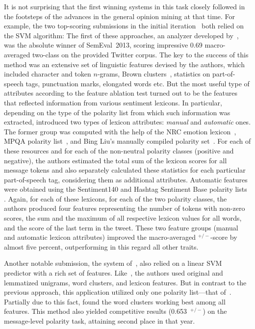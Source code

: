 It is not surprising that the first winning systems in this task
closely followed in the footsteps of the advances in the general
opinion mining at that time.  For example, the two top-scoring
submissions in the initial iteration~\cite{Mohammad:13,Guenther:13}
both relied on the SVM algorithm: The first of these approaches, an
analyzer developed by~\citet{Mohammad:13}, was the absolute winner of
SemEval~2013, scoring impressive 0.69 macro-averaged two-class \F{} on
the provided Twitter corpus.  The key to the success of this method
was an extensive set of linguistic features devised by the authors,
which included character and token $n$-grams, Brown
clusters~\cite{Brown:92}, statistics on part-of-speech tags,
punctuation marks, elongated words etc.  But the most useful type of
attributes according to the feature ablation test turned out to be the
features that reflected information from various sentiment
lexicons. In particular, depending on the type of the polarity list
from which such information was extracted, \citeauthor{Mohammad:13}
introduced two types of lexicon attributes: \emph{manual} and
\emph{automatic} ones.  The former group was computed with the help of
the NRC emotion lexicon~\cite{Mohammad:13a}, MPQA polarity
list~\cite{Wilson:05}, and Bing Liu's manually compiled polarity
set~\cite{Hu:04}.  For each of these resources and for each of the
non-neutral polarity classes (positive and negative), the authors
estimated the total sum of the lexicon scores for all message tokens
and also separately calculated these statistics for each particular
part-of-speech tag, considering them as additional attributes.
Automatic features were obtained using the Sentiment140 and Hashtag
Sentiment Base polarity lists \cite{Kiritchenko:14}.  Again, for each
of these lexicons, for each of the two polarity classes, the authors
produced four features representing the number of tokens with non-zero
scores, the sum and the maximum of all respective lexicon values for
all words, and the score of the last term in the tweet.  These two
feature groups (manual and automatic lexicon attributes) improved the
macro-averaged \F{}$^{+/-}$-score by almost five percent,
outperforming in this regard all other traits.

Another notable submission, the system of~\citet{Guenther:13}, also
relied on a linear SVM predictor with a rich set of features.
Like~\citet{Mohammad:13}, the authors used original and lemmatized
unigrams, word clusters, and lexicon features.  But in contrast to the
previous approach, this application utilized only one polarity
list---that of~\citet{Esuli:05}.  Partially due to this fact,
\citeauthor{Guenther:13} found the word clusters working best among
all features.  This method also yielded competitive results
(0.653~\F{}$^{+/-}$) on the message-level polarity task, attaining
second place in that year.

